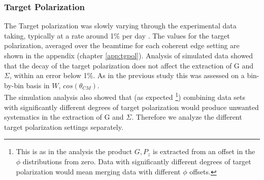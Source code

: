 \subsubsection{Target Polarization}\label{sec:tg_pol_sys}
The Target polarization was slowly varying through the experimental data taking, typically at a rate around 1\% per day \cite{Keith_2012}. The values for the target polarization, averaged over the beamtime for each coherent edge setting are shown in the appendix (chapter \ref{app:tgpol}).  Analysis of simulated data showed that the decay of the target polarization does not affect the extraction of G and $\Sigma$, within an error below 1\%. As in the previous study this was assessed on a bin-by-bin basis in $W$, $cos(\theta_{CM})$. \\
The simulation analysis also showed that (as expected \footnote{This is as in the analysis the product $G,P_z$ is extracted from an offset in the $\phi$ distributions from zero. Data with significantly different degrees of target polarization would mean merging data with different $\phi$ offsets.}) combining data sets with significantly different degrees of target polarization would produce unwanted systematics in the extraction of G and $\Sigma$. Therefore we analyze the different target polarization settings separately. 

  
